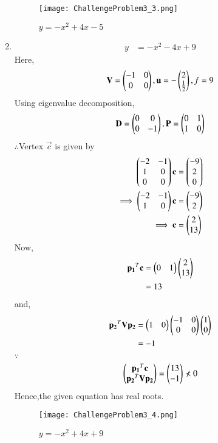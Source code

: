 \documentclass[journal,12pt,twocolumn]{IEEEtran}
\begin{document}
\begin{enumerate}
    \begin{figure}[!ht]
    \centering
    \texttt{[image: ChallengeProblem3\_3.png]}
    \caption{$y=-x^2+4x-5$}
    \label{ex3}	
    \end{figure}
    
    \item
    \begin{align}
        y &= -x^2-4x+9
    \end{align}
    Here,
    \begin{align}
        \mathbf{V} = \begin{pmatrix}-1 & 0 \\ 0 & 0\end{pmatrix},\mathbf{u}=-\begin{pmatrix}2 \\ \frac{1}{2}\end{pmatrix},f=9
    \end{align}
    Using eigenvalue decomposition,
    \begin{align}
        \mathbf{D} = \begin{pmatrix}0 & 0\\0 & -1\end{pmatrix} ,\mathbf{P}=\begin{pmatrix}0 & 1\\1 & 0\end{pmatrix}
    \end{align}
    $\therefore$Vertex $\vec{c}$ is given by
    \begin{align}
        \begin{pmatrix}-2 & -1 \\ 1 & 0 \\ 0 & 0\end{pmatrix}\mathbf{c} &= \begin{pmatrix}-9 \\ 2 \\ 0\end{pmatrix} \\
        \implies  \begin{pmatrix}-2 & -1 \\ 1 & 0\end{pmatrix}\mathbf{c} &= \begin{pmatrix}-9 \\ 2\end{pmatrix}
        \\
        \implies \mathbf{c} &= \begin{pmatrix}2\\13\end{pmatrix}
    \end{align}
    Now,
    \begin{align}
        \mathbf{p_1}^T\mathbf{c} &= \begin{pmatrix}0 & 1\end{pmatrix}\begin{pmatrix}2 \\ 13\end{pmatrix}
        \\
        &= 13
    \end{align}
    and,
    \begin{align}
        \mathbf{p_2}^T\mathbf{V}\mathbf{p_2} &= \begin{pmatrix}1 & 0\end{pmatrix}\begin{pmatrix}-1 & 0\\0& 0\end{pmatrix}\begin{pmatrix}1 \\ 0\end{pmatrix}
        \\
        &= -1
    \end{align}
    $\because$
    \begin{align}
    \begin{pmatrix}\mathbf{p_1}^T\mathbf{c} \\ \mathbf{p_2}^T\mathbf{V}\mathbf{p_2}\end{pmatrix} = \begin{pmatrix}13 \\ -1\end{pmatrix} \nprec 0 
    \end{align}
    Hence,the given equation has real roots.
    
    \begin{figure}[!ht]
    \centering
    \texttt{[image: ChallengeProblem3\_4.png]}
    \caption{$y=-x^2+4x+9$}
    \label{ex4}	
    \end{figure}

\end{enumerate}
\end{document}
